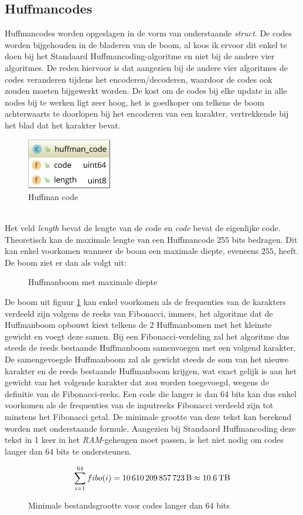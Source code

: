 \subsection{Huffmancodes}
Huffmancodes worden opgeslagen in de vorm van onderstaande \emph{struct}. De codes worden bijgehouden in de bladeren van de boom, al koos ik ervoor dit enkel te doen bij het Standaard Huffmancoding-algoritme en niet bij de andere vier algoritmes. De reden hiervoor is dat aangezien bij de andere vier algoritmes de codes veranderen tijdens het encoderen/decoderen, waardoor de codes ook zouden moeten bijgewerkt worden. De kost om de codes bij elke update in alle nodes bij te werken ligt zeer hoog, het is goedkoper om telkens de boom achterwaarts te doorlopen bij het encoderen van een karakter, vertrekkende bij het blad dat het karakter bevat.
\begin{figure}[h]
	\centering
	\includegraphics[width=10em]{resources/huffman-code.png}
	\caption{Huffman code}
\end{figure}
\\Het veld \emph{length} bevat de lengte van de code en \emph{code} bevat de eigenlijke code. Theoretisch kan de maximale lengte van een Huffmancode $255$ bits bedragen. Dit kan enkel voorkomen wanneer de boom een maximale diepte, eveneens $255$, heeft. De boom ziet er dan als volgt uit:
\newpage
\begin{figure}[h]
	\centering
	
	\label{fig:maxpath}
	\caption{Huffmanboom met maximale diepte}
\end{figure}
\noindent De boom uit figuur \ref{fig:maxpath} kan enkel voorkomen als de frequenties van de karakters verdeeld zijn volgens de reeks van Fibonacci, immers, het algoritme dat de Huffmanboom opbouwt kiest telkens de 2 Huffmanbomen met het kleinste gewicht en voegt deze samen. Bij een Fibonacci-verdeling zal het algoritme dus steeds de reeds bestaande Huffmanboom samenvoegen met een volgend karakter. De samengevoegde Huffmanboom zal als gewicht steeds de som van het nieuwe karakter en de reeds bestaande Huffmanboom krijgen, wat exact gelijk is aan het gewicht van het volgende karakter dat zou worden toegevoegd, wegens de definitie van de Fibonacci-reeks. Een code die langer is dan 64 bits kan dus enkel voorkomen als de frequenties van de inputreeks Fibonacci verdeeld zijn tot minstens het  Fibonacci getal. De minimale grootte van deze tekst kan berekend worden met onderstaande formule. Aangezien bij Standaard Huffmancoding deze tekst in 1 keer in het \emph{RAM}-geheugen moet passen, is het niet nodig om codes langer dan 64 bits te ondersteunen.
\begin{figure}[h]
	$$\sum_{i=1}^{64} fibo(i) = \text{\SI{10610209857723}{\byte}} \approx \SI{10.6}{\tera\byte}$$
	\caption{Minimale bestandsgrootte voor codes langer dan 64 bits}
\end{figure}